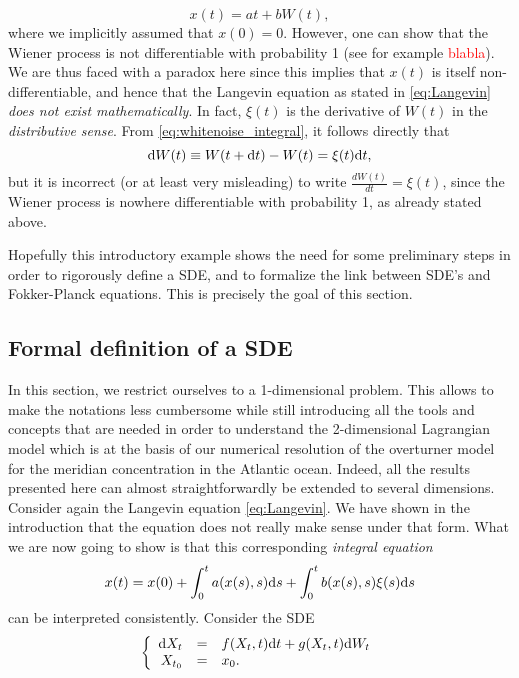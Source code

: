\begin{equation}
	x(t) = at + bW(t),
\end{equation}
where we implicitly assumed that $x(0) = 0$. However, one can show that the Wiener process is not differentiable with probability 1 (see for example \textcolor{red}{blabla}). We are thus faced with a paradox here since this implies that $x(t)$ is itself non-differentiable, and hence that the Langevin equation as stated in \eqref{eq:Langevin} \textit{does not exist mathematically}. In fact, $\xi(t)$ is the derivative of $W(t)$ in the \textit{distributive sense}. From \eqref{eq:whitenoise_integral}, it follows directly that
\begin{equation}
	\rm dW(t) \equiv W(t+\rm dt) - W(t) = \xi(t) \rm dt,
\end{equation}
but it is incorrect (or at least very misleading) to write $\frac{dW(t)}{dt} = \xi(t)$, since the Wiener process is nowhere differentiable with probability 1, as already stated above.

Hopefully this introductory example shows the need for some preliminary steps in order to rigorously define a SDE, and to formalize the link between SDE's and Fokker-Planck equations. This is precisely the goal of this section.

\subsection{Formal definition of a SDE}
In this section, we restrict ourselves to a 1-dimensional problem. This allows to make the notations less cumbersome while still introducing all the tools and concepts that are needed in order to understand the 2-dimensional Lagrangian model which is at the basis of our numerical resolution of the overturner model for the meridian concentration in the Atlantic ocean. Indeed, all the results presented here can almost straightforwardly be extended to several dimensions. Consider again the Langevin equation \eqref{eq:Langevin}. We have shown in the introduction that the equation does not really make sense under that form. What we are now going to show is that this corresponding \textit{integral equation} 
\begin{equation}
	x(t) = x(0) + \int_0^t a(x(s),s) \rm ds + \int_0^t b(x(s),s) \xi(s) \rm ds
\end{equation}
can be interpreted consistently. 
Consider the SDE
\begin{equation}
	\left\{
	\begin{array}{rcl} \label{eq:generalSDE}
		\rm dX_t &=& f(X_t,t) \rm dt + g(X_t,t) \rm dW_t\\
		X_{t_0} &=& x_0. 
	\end{array}
	\right.
\end{equation}


